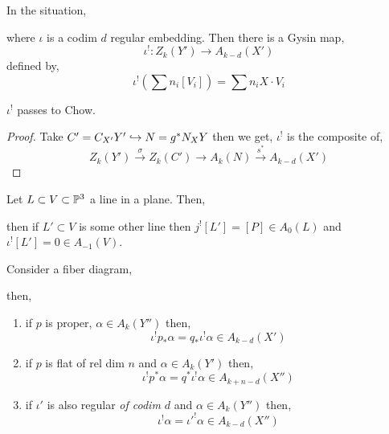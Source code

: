 \documentclass[12pt]{article}
\begin{document}
In the situation,
\begin{center}
\end{center}
where $\iota$ is a codim $d$ regular embedding. Then there is a Gysin map,
\[ \iota^! : Z_k(Y') \to A_{k-d}(X') \]
defined by,
\[ \iota^! \left( \sum n_i [V_i] \right) = \sum n_i X \cdot V_i \]

\begin{lemma}
$\iota^!$ passes to Chow.
\end{lemma}

\begin{proof}
Take $C' = C_{X'} Y' \embed N = g^* N_X Y$ then we get, $\iota^!$ is the composite of,
\[ Z_k(Y') \xrightarrow{\sigma} Z_k(C') \to A_k(N) \xrightarrow{s^*} A_{k-d}(X') \]
\end{proof}

\begin{example}
Let $L \subset V \subset \P^3$ a line in a plane. Then,
\begin{center}
\end{center}
then if $L' \subset V$ is some other line then $j^! [L'] = [P] \in A_0(L)$ and $\iota^! [L'] = 0 \in A_{-1}(V)$.
\end{example}

\begin{theorem}
Consider a fiber diagram,
\begin{center}
\end{center}
then,
\begin{enumerate}
\item if $p$ is proper, $\alpha \in A_k(Y'')$ then,
\[ \iota^! p_* \alpha = q_* \iota^!  \alpha \in A_{k-d}(X') \]

\item if $p$ is flat of rel dim $n$  and $\alpha \in A_k(Y')$ then,
\[ \iota^! p^* \alpha = q^* \iota^! \alpha \in A_{k+n-d}(X'') \]

\item if $\iota'$ is also regular \textit{of codim $d$} and $\alpha \in A_k(Y'')$ then,
\[ \iota^! \alpha = \iota'^! \alpha \in A_{k-d}(X'') \]
\end{enumerate}
\end{theorem}
\end{document}
